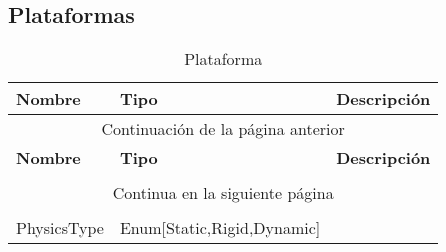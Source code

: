 \subsection{Plataformas}

\begin{longtable}[H]{
    @{}
    l
    l
    l
    @{}
    }%

    \toprule        %
    \textbf{Nombre} & \textbf{Tipo} & \textbf{Descripción} \\      %
    \midrule        %
    \endfirsthead   %

    \multicolumn{3}{c}{Continuación de la página anterior}\\
    \toprule
    \textbf{Nombre} & \textbf{Tipo} & \textbf{Descripción} \\\\      %
    \midrule        %
    \endhead        %

    \midrule
    \multicolumn{3}{c}{Continua en la siguiente página}\\ %
    \endfoot        %

    \bottomrule
    \caption{Plataforma \label{tab:entidad_plataforma}} \\
    \endlastfoot    %

    PhysicsType & Enum[Static,Rigid,Dynamic]    & \\
\end{longtable}